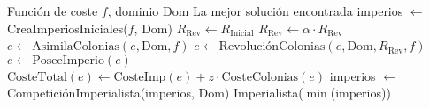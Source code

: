 \begin{algorithm}
  \begin{algorithmic}
    \REQUIRE Función de coste $f$, dominio $\mathrm{Dom}$
    \ENSURE La mejor solución encontrada
    \STATE imperios $\leftarrow$ CreaImperiosIniciales($f$, Dom)
    \STATE $R_{\mathrm{Rev}} \leftarrow R_{\mathrm{Inicial}}$
       \STATE $R_{\mathrm{Rev}} \leftarrow \alpha \cdot R_{\mathrm{Rev}}$
          \STATE $e \leftarrow \mathrm{AsimilaColonias}(e, \mathrm{Dom}, f)$
          \STATE $e \leftarrow \mathrm{RevoluciónColonias}(e, \mathrm{Dom}, R_{\mathrm{Rev}}, f)$
          \STATE $e \leftarrow \mathrm{PoseeImperio}(e)$
          \STATE $\mathrm{CosteTotal}(e) \leftarrow \mathrm{CosteImp}(e) + z \cdot \mathrm{CosteColonias}(e)$
        \ENDFOR
    \STATE imperios $\leftarrow$ CompeticiónImperialista(imperios, Dom)
    \ENDFOR
    \RETURN Imperialista($\min$(imperios))
\end{algorithmic}
\end{algorithm}
